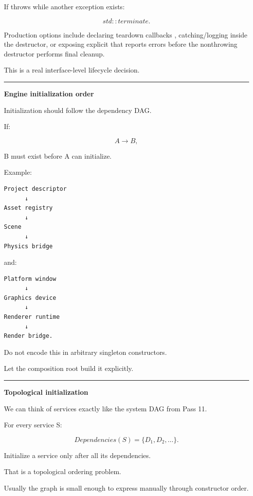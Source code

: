 If  throws while another exception exists:

\[
std::terminate.
\]

Production options include declaring teardown callbacks , catching/logging inside the destructor, or exposing explicit  that reports errors before the nonthrowing destructor performs final cleanup.

This is a real interface-level lifecycle decision.

\begin{center}\rule{0.5\linewidth}{0.5pt}\end{center}

\textbf{Engine initialization order}

Initialization should follow the dependency DAG.

If:

\[
A\rightarrow B,
\]

B must exist before A can initialize.

Example:

\begin{verbatim}
Project descriptor
      ↓
Asset registry
      ↓
Scene
      ↓
Physics bridge
\end{verbatim}

and:

\begin{verbatim}
Platform window
      ↓
Graphics device
      ↓
Renderer runtime
      ↓
Render bridge.
\end{verbatim}

Do not encode this in arbitrary singleton constructors.

Let the composition root build it explicitly.

\begin{center}\rule{0.5\linewidth}{0.5pt}\end{center}

\textbf{Topological initialization}

We can think of services exactly like the system DAG from Pass 11.

For every service S:

\[
Dependencies(S)=\{D_1,D_2,\dots\}.
\]

Initialize a service only after all its dependencies.

That is a topological ordering problem.

Usually the graph is small enough to express manually through constructor order.

